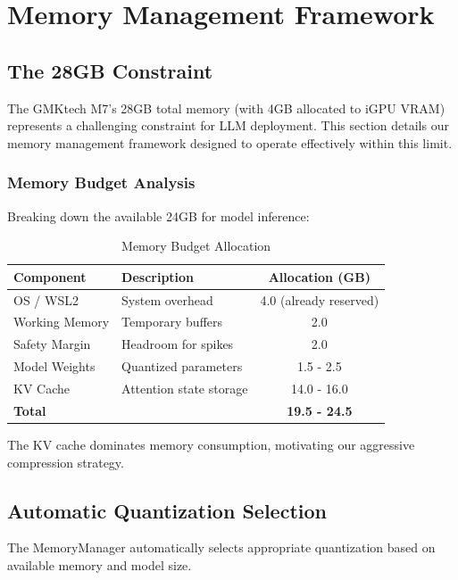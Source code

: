 \section{Memory Management Framework}
\label{sec:memory}

\subsection{The 28GB Constraint}

The GMKtech M7's 28GB total memory (with 4GB allocated to iGPU VRAM) represents a challenging constraint for LLM deployment. This section details our memory management framework designed to operate effectively within this limit.

\subsubsection{Memory Budget Analysis}

Breaking down the available 24GB for model inference:

\begin{table}[h]
\centering
\caption{Memory Budget Allocation}
\label{tab:memory_budget}
\begin{tabular}{llc}
\toprule
\textbf{Component} & \textbf{Description} & \textbf{Allocation (GB)} \\
\midrule
OS / WSL2 & System overhead & 4.0 (already reserved) \\
Working Memory & Temporary buffers & 2.0 \\
Safety Margin & Headroom for spikes & 2.0 \\
Model Weights & Quantized parameters & 1.5 - 2.5 \\
KV Cache & Attention state storage & 14.0 - 16.0 \\
\midrule
\textbf{Total} & & \textbf{19.5 - 24.5} \\
\bottomrule
\end{tabular}
\end{table}

The KV cache dominates memory consumption, motivating our aggressive compression strategy.

\subsection{Automatic Quantization Selection}

The MemoryManager automatically selects appropriate quantization based on available memory and model size.

